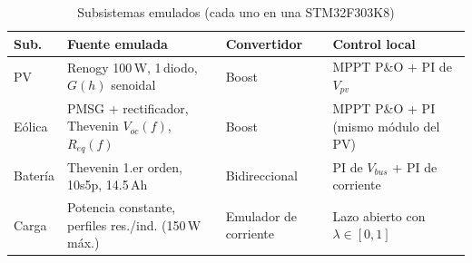 \documentclass[conference]{IEEEtran}
\begin{document}
\begin{table}[H]
\caption{Subsistemas emulados (cada uno en una STM32F303K8)}
\label{tab:sub}
\centering
\scriptsize\setlength{\tabcolsep}{2.5pt}
\begin{tabular}{|l|p{2.0cm}|p{1.5cm}|p{2.0cm}|}
\hline
\textbf{Sub.} & \textbf{Fuente emulada} & \textbf{Convertidor} & \textbf{Control local} \\
\hline
PV & Renogy 100\,W, 1\,diodo, $G(h)$ senoidal & Boost & MPPT P\&O + PI de $V_{pv}$ \\ \hline
Eólica & PMSG + rectificador, Thevenin $V_{oc}(f)$, $R_{eq}(f)$ & Boost & MPPT P\&O + PI (mismo módulo del PV) \\ \hline
Batería & Thevenin 1.er orden, 10s5p, 14.5\,Ah & Bidireccional & PI de $V_{bus}$ + PI de corriente \\ \hline
Carga & Potencia constante, perfiles res./ind. (150\,W máx.) & Emulador de corriente & Lazo abierto con $\lambda\in[0,1]$ \\ \hline
\end{tabular}
\end{table}
\end{document}
